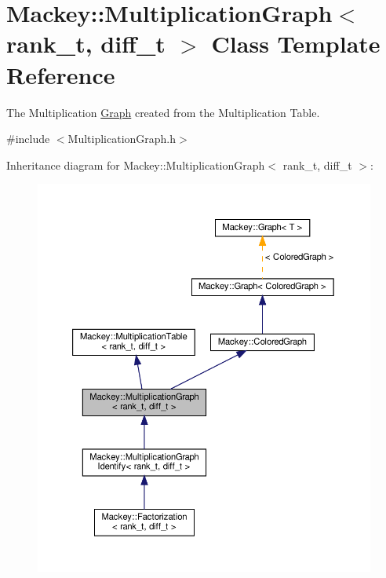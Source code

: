 \hypertarget{classMackey_1_1MultiplicationGraph}{}\section{Mackey\+:\+:Multiplication\+Graph$<$ rank\+\_\+t, diff\+\_\+t $>$ Class Template Reference}
\label{classMackey_1_1MultiplicationGraph}


The Multiplication \hyperlink{classMackey_1_1Graph}{Graph} created from the Multiplication Table.  




{\ttfamily \#include $<$Multiplication\+Graph.\+h$>$}



Inheritance diagram for Mackey\+:\+:Multiplication\+Graph$<$ rank\+\_\+t, diff\+\_\+t $>$\+:\nopagebreak
\begin{figure}[H]
\begin{center}
\leavevmode
\includegraphics[width=350pt]{classMackey_1_1MultiplicationGraph__inherit__graph}
\end{center}
\end{figure}


